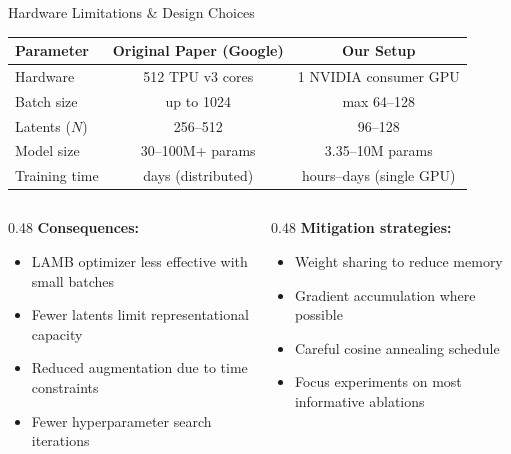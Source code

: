 \documentclass[aspectratio=169,11pt]{beamer}
\begin{document}
\begin{frame}[shrink=8]{Hardware Limitations \& Design Choices}
  \begin{table}
    \centering\small
    \begin{tabular}{lcc}
      \toprule
      \textbf{Parameter} & \textbf{Original Paper (Google)} & \textbf{Our Setup} \\
      \midrule
      Hardware & 512 TPU v3 cores & 1 NVIDIA consumer GPU \\
      Batch size & up to 1024 & max 64--128 \\
      Latents ($N$) & 256--512 & 96--128 \\
      Model size & 30--100M+ params & 3.35--10M params \\
      Training time & days (distributed) & hours--days (single GPU) \\
      \bottomrule
    \end{tabular}
  \end{table}

  \vspace{0.5em}
  \begin{columns}[T]
    \begin{column}{0.48\textwidth}
      \textbf{Consequences:}
      \begin{itemize}
        \item LAMB optimizer less effective with small batches
        \item Fewer latents limit representational capacity
        \item Reduced augmentation due to time constraints
        \item Fewer hyperparameter search iterations
      \end{itemize}
    \end{column}
    \begin{column}{0.48\textwidth}
      \textbf{Mitigation strategies:}
      \begin{itemize}
        \item Weight sharing to reduce memory
        \item Gradient accumulation where possible
        \item Careful cosine annealing schedule
        \item Focus experiments on most informative ablations
      \end{itemize}
    \end{column}
  \end{columns}
\end{frame}
\end{document}
